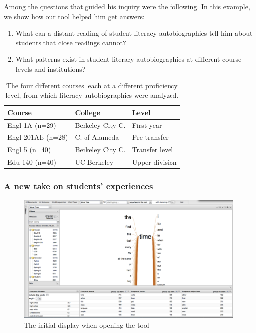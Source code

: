 \documentclass{sig-alternate}
\begin{document}
Among the questions that guided his inquiry were the following. In this example, we show how our tool helped him get answers:
\begin{enumerate}
\item What can a distant reading of student literacy autobiographies tell him about students that close readings cannot?
\item What patterns exist in student literacy autobiographies at different course levels and institutions?
\end{enumerate}


\begin{table}
\begin{tabular}{lll}
Course& College & Level \\
\hline
Engl 1A (n=29) & Berkeley City C.& First-year \\
Engl 201AB (n=28) & C. of Alameda & Pre-transfer \\
Engl 5 (n=40) & Berkeley City C. & Transfer level \\
Edu 140 (n=40) & UC Berkeley & Upper division \\
\end{tabular}
\caption{The four different courses, each at a different proficiency level, from which literacy autobiographies were analyzed. \label{table:rex-courses}}
\end{table}


 \subsubsection{A new take on students' experiences}

\begin{figure}
\includegraphics[width=\textwidth]{fig/rex/01.png}
\caption{The initial display when opening the tool \label{fig:rex01}}
\end{figure}
\end{document}

